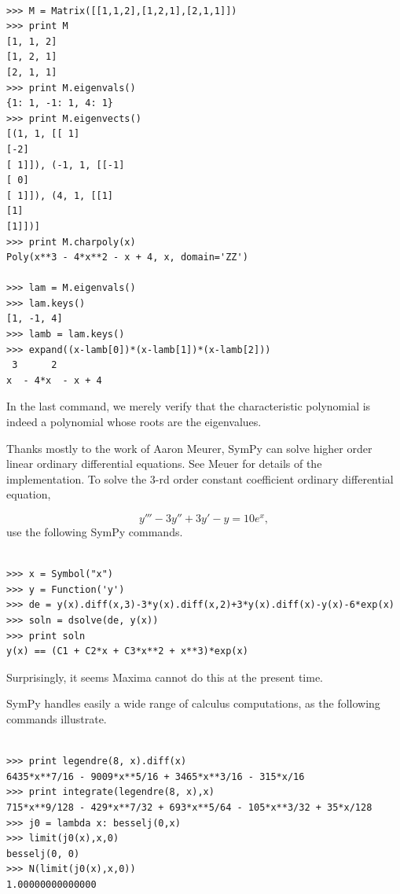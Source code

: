\documentclass[12pt]{article}
\begin{document}
\begin{Verbatim}[fontsize=\scriptsize,fontfamily=courier,fontshape=tt,frame=single,label=SymPy]

>>> M = Matrix([[1,1,2],[1,2,1],[2,1,1]])
>>> print M
[1, 1, 2]
[1, 2, 1]
[2, 1, 1]
>>> print M.eigenvals()
{1: 1, -1: 1, 4: 1}
>>> print M.eigenvects()
[(1, 1, [[ 1]
[-2]
[ 1]]), (-1, 1, [[-1]
[ 0]
[ 1]]), (4, 1, [[1]
[1]
[1]])]
>>> print M.charpoly(x)
Poly(x**3 - 4*x**2 - x + 4, x, domain='ZZ')

>>> lam = M.eigenvals()
>>> lam.keys()                
[1, -1, 4]
>>> lamb = lam.keys()
>>> expand((x-lamb[0])*(x-lamb[1])*(x-lamb[2]))
 3      2        
x  - 4*x  - x + 4

\end{Verbatim}

\noindent
In the last command, we merely verify that the characteristic
polynomial is indeed a polynomial whose roots are the eigenvalues.

Thanks mostly to the work of Aaron Meurer, 
SymPy can solve higher order linear ordinary differential equations.
See Meuer \cite{M} for details of the implementation.
To solve the $3$-rd order constant coefficient ordinary differential
equation,

\[
y'''-3y''+3y'-y=10e^x,
\]
use the following SymPy commands.

\begin{Verbatim}[fontsize=\scriptsize,fontfamily=courier,fontshape=tt,frame=single,label=SymPy]

>>> x = Symbol("x")
>>> y = Function('y')
>>> de = y(x).diff(x,3)-3*y(x).diff(x,2)+3*y(x).diff(x)-y(x)-6*exp(x)
>>> soln = dsolve(de, y(x))
>>> print soln
y(x) == (C1 + C2*x + C3*x**2 + x**3)*exp(x)

\end{Verbatim}

\noindent
Surprisingly, it seems Maxima cannot do this at the present time.

SymPy handles easily a wide range of calculus computations, as the following 
commands illustrate.

\begin{Verbatim}[fontsize=\scriptsize,fontfamily=courier,fontshape=tt,frame=single,label=SymPy]

>>> print legendre(8, x).diff(x)
6435*x**7/16 - 9009*x**5/16 + 3465*x**3/16 - 315*x/16
>>> print integrate(legendre(8, x),x)
715*x**9/128 - 429*x**7/32 + 693*x**5/64 - 105*x**3/32 + 35*x/128
>>> j0 = lambda x: besselj(0,x)
>>> limit(j0(x),x,0)
besselj(0, 0)
>>> N(limit(j0(x),x,0))
1.00000000000000

\end{Verbatim}
\end{document}
